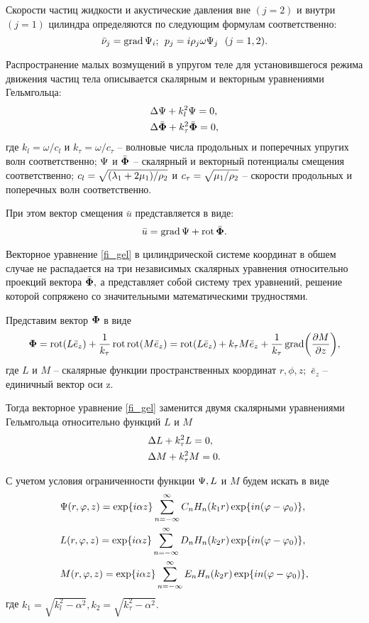 Скорости частиц жидкости и акустические давления вне $(j=2)$ и внутри $(j=1)$ цилиндра определяются по следующим формулам соответственно:
\begin{equation}
\bar{\nu}_j=\grad\P_i;\:\:p_j=i\r_j\omega\P_j\:\:\:(j=1,2).
\end{equation}

Распространение малых возмущений в упругом теле для установившегося режима движения частиц тела описывается скалярным и векторным уравнениями Гельмгольца:
\begin{align}
&\Lap\P+k_l^2\P=0,\\
&\Lap\bar{\F}+k_{\tau}^2\bar{\F}=0,\label{fi_gel}
\end{align}
где $k_l=\omega/c_l$ и $k_{\tau}=\omega/c_{\tau}$ -- волновые числа продольных и поперечных упругих волн соответственно; $\P$ и $\bar\F$ -- скалярный и векторный потенциалы смещения соответственно; $c_l=\sqrt{(\lambda_1+2\mu_1)/\r_2}$ и $c_{\tau}=\sqrt{\mu_1/\r_2}$ -- скорости продольных и поперечных волн соответственно.

При этом вектор смещения $\bar{u}$ представляется в виде:
\begin{equation}
\bar{u}=\grad\P+\rot\bar{\F}.
\end{equation}

Векторное уравнение \eqref{fi_gel} в цилиндрической системе координат в обшем случае не распадается на три независимых скалярных уравнения относительно проекций вектора $\bar{\F},$ а представляет собой систему трех уравнений, решение которой сопряжено со значительными математическими трудностями.

Представим вектор $\F$ в виде
$$\F=\rot(L\bar{e}_z)+\frac1{k_\tau}\rot\rot(M\bar{e}_z)=\rot(L\bar{e}_z)+k_\tau M\bar{e}_z+\frac1{k_\tau}\grad\biggl(\frac{\partial M}{\partial z}\biggr),$$
где $L$ и $M$ -- скалярные функции пространственных координат $r, \phi, z;$ $\bar{e}_z$ -- единичный вектор оси z.

Тогда векторное уравнение \eqref{fi_gel} заменится двумя скалярными уравнениями Гельмгольца относительно функций $L$ и $M$
\begin{align*}
&\Lap L+k_{\tau}^2L=0,\\
&\Lap M+k_{\tau}^2M=0.
\end{align*}

С учетом условия ограниченности функции $\P, L$ и $M$ будем искать в виде
\begin{align}
&\P(r, \f, z)= \exp\{i\alpha z\}\sum_{n=-\infty}^{\infty}C_nH_n(k_1 r)\exp\{in(\f-\f_0)\},\\
&L(r, \f, z)= \exp\{i\alpha z\}\sum_{n=-\infty}^{\infty}D_nH_n(k_2 r)\exp\{in(\f-\f_0)\},\\
&M(r, \f, z)= \exp\{i\alpha z\}\sum_{n=-\infty}^{\infty}E_nH_n(k_2 r)\exp\{in(\f-\f_0)\},
\end{align}
где $k_1=\sqrt{k_l^2-\alpha^2}, k_2=\sqrt{k_{\tau}^2-\alpha^2}.$

